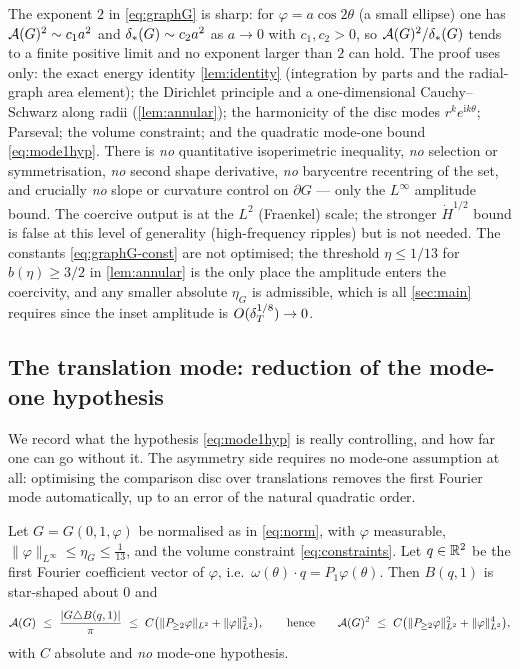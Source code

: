 \begin{remark}\label{rem:sharp}
The exponent $2$ in \eqref{eq:graphG} is sharp: for $\varphi=a\cos2\theta$
(a small ellipse) one has $\mathcal{A}(G)^2\sim c_1a^2$ and $\delta_{*}(G)\sim c_2a^2$ as
$a\to0$ with $c_1,c_2>0$, so $\mathcal{A}(G)^2/\delta_{*}(G)$ tends to a finite positive
limit and no exponent larger than $2$ can hold. The proof uses only: the
exact energy identity \cref{lem:identity} (integration by parts and the
radial-graph area element); the Dirichlet principle and a one-dimensional
Cauchy--Schwarz along radii (\cref{lem:annular}); the harmonicity of the
disc modes $r^k e^{\mathrm i k\theta}$; Parseval; the volume constraint; and
the quadratic mode-one bound \eqref{eq:mode1hyp}. There is \emph{no}
quantitative isoperimetric inequality, \emph{no} selection or symmetrisation,
\emph{no} second shape derivative, \emph{no} barycentre recentring of the
set, and crucially \emph{no} slope or curvature control on $\partial G$ ---
only the $L^\infty$ amplitude bound. The coercive output is at the $L^2$
(Fraenkel) scale; the stronger $\dot H^{1/2}$ bound is false at this level of
generality (high-frequency ripples) but is not needed. The constants
\eqref{eq:graphG-const} are not optimised; the threshold $\eta\le1/13$ for
$b(\eta)\ge3/2$ in \cref{lem:annular} is the only place the amplitude enters
the coercivity, and any smaller absolute $\eta_G$ is admissible, which is all
\cref{sec:main} requires since the inset amplitude is $O(\delta_T^{1/8})\to0$.
\end{remark}

\subsection{The translation mode: reduction of the mode-one hypothesis}
\label{ss:translation}

We record what the hypothesis \eqref{eq:mode1hyp} is really controlling, and
how far one can go without it. The asymmetry side requires no mode-one
assumption at all: optimising the comparison disc over translations removes the
first Fourier mode automatically, up to an error of the natural quadratic
order.

\begin{lemma}\label{lem:shift-asym}
Let $G=G(0,1,\varphi)$ be normalised as in \eqref{eq:norm}, with $\varphi$
measurable, $\|\varphi\|_{L^\infty}\le\eta_G\le\tfrac1{13}$, and the volume
constraint \eqref{eq:constraints}. Let $q\in\mathbb{R}^2$ be the first Fourier
coefficient vector of $\varphi$, i.e.\ $\omega(\theta)\cdot q=P_1\varphi(\theta)$.
Then $B(q,1)$ is star-shaped about $0$ and
\begin{equation}\label{eq:shift-asym}
   \AF(G)\ \le\ \frac{|G\triangle B(q,1)|}{\pi}
   \ \le\ C\bigl(\|P_{\ge2}\varphi\|_{L^2}+\|\varphi\|_{L^2}^2\bigr),
   \qquad\text{hence}\qquad
   \AF(G)^2\ \le\ C\bigl(\|P_{\ge2}\varphi\|_{L^2}^2+\|\varphi\|_{L^2}^4\bigr),
\end{equation}
with $C$ absolute and \emph{no} mode-one hypothesis.
\end{lemma}

